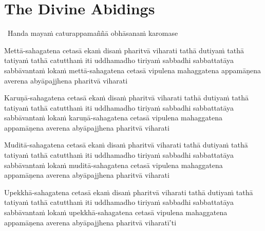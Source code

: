 \suttaRef{[AN 3.65 \& AN 5.57]}


\section{The Divine Abidings}
\label{divine-abidings}

\begin{leader}
  \anglebracketleft\ \hspace{-0.5mm}Handa mayaṁ caturappamaññā obhāsanaṁ karomase \hspace{-0.5mm}\anglebracketright\
\end{leader}

\begin{pali-hang}
  Mettā-sahagatena cetasā ekaṁ disaṁ pharitvā viharati tathā dutiyaṁ tathā tatiyaṁ tathā catutthaṁ iti uddhamadho tiriyaṁ sabbadhi sabbattatāya sabbāvantaṁ lokaṁ mettā-sahagatena cetasā vipulena mahaggatena appamāṇena averena abyāpajjhena pharitvā viharati
\end{pali-hang}

\medskip

\begin{pali-hang}
  Karuṇā-sahagatena cetasā ekaṁ disaṁ pharitvā viharati tathā dutiyaṁ tathā tatiyaṁ tathā catutthaṁ iti uddhamadho tiriyaṁ sabbadhi sabbattatāya sabbāvantaṁ lokaṁ karuṇā-sahagatena cetasā vipulena mahaggatena appamāṇena averena abyāpajjhena pharitvā viharati
\end{pali-hang}

\medskip

\begin{pali-hang}
  Muditā-sahagatena cetasā ekaṁ disaṁ pharitvā viharati tathā dutiyaṁ tathā tatiyaṁ tathā catutthaṁ iti uddhamadho tiriyaṁ sabbadhi sabbattatāya sabbāvantaṁ lokaṁ muditā-sahagatena cetasā vipulena mahaggatena appamāṇena averena abyāpajjhena pharitvā viharati
\end{pali-hang}

\medskip

\begin{pali-hang}
  Upekkhā-sahagatena cetasā ekaṁ disaṁ pharitvā viharati tathā dutiyaṁ tathā tatiyaṁ tathā catutthaṁ iti uddhamadho tiriyaṁ sabbadhi sabbattatāya sabbāvantaṁ lokaṁ upekkhā-sahagatena cetasā vipulena mahaggatena appamāṇena averena abyāpajjhena pharitvā viharatī'ti
\end{pali-hang}

\clearpage

